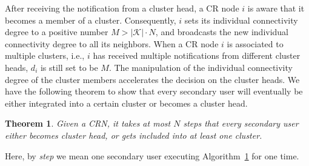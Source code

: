 \documentclass[times]{ettauth}
\newcommand{\ie}{i.e., }
\theoremstyle{mytheoremstyle}
\newtheorem{theorem}{Theorem}[section]
\theoremstyle{mytheoremstyle}
\theoremstyle{mytheoremstyle}
\begin{document}
After receiving the notification from a cluster head, a CR node $i$ is aware that it becomes a member of a cluster. 
Consequently, $i$ sets its individual connectivity degree to a positive number $M > |\mathcal{K}| \cdot N$, and broadcasts the new individual connectivity degree to all its neighbors. 
When a CR node $i$ is associated to multiple clusters, \ie $i$ has received multiple notifications from different cluster heads, $d_i$ is still set to be $M$. 
The manipulation of the individual connectivity degree of the cluster members accelerates the decision on the cluster heads.
We have the following theorem to show that every secondary user will eventually be either integrated into a certain cluster or becomes a cluster head.
\begin{theorem}
\label{clustering:theorem}
Given a CRN, it takes at most $N$ steps that every secondary user either becomes cluster head, or gets included into at least one cluster.
\end{theorem}
Here, by \textit{step} we mean one secondary user executing Algorithm~\ref{clustering:theorem} for one time.
\end{document}
